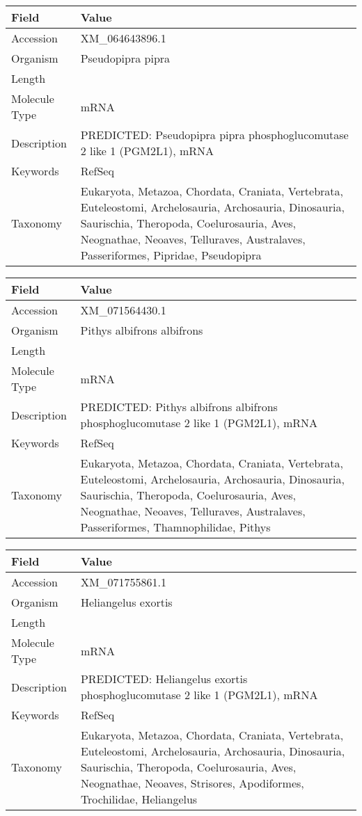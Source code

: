 \documentclass[10pt]{article}
\begin{document}
{\footnotesize
\begin{longtable}{>{\raggedright\arraybackslash}p{4.5cm} >{\raggedright\arraybackslash}p{11.5cm}}
\textbf{Field} & \textbf{Value} \\
\hline
Accession & XM\_064643896.1 \\
Organism & Pseudopipra pipra \\
Length & 5971 \\
Molecule Type & mRNA \\
Description & PREDICTED: Pseudopipra pipra phosphoglucomutase 2 like 1 (PGM2L1), mRNA \\
Keywords & RefSeq \\
Taxonomy & Eukaryota, Metazoa, Chordata, Craniata, Vertebrata, Euteleostomi, Archelosauria, Archosauria, Dinosauria, Saurischia, Theropoda, Coelurosauria, Aves, Neognathae, Neoaves, Telluraves, Australaves, Passeriformes, Pipridae, Pseudopipra \\
\end{longtable}
}

{\footnotesize
\begin{longtable}{>{\raggedright\arraybackslash}p{4.5cm} >{\raggedright\arraybackslash}p{11.5cm}}
\textbf{Field} & \textbf{Value} \\
\hline
Accession & XM\_071564430.1 \\
Organism & Pithys albifrons albifrons \\
Length & 5849 \\
Molecule Type & mRNA \\
Description & PREDICTED: Pithys albifrons albifrons phosphoglucomutase 2 like 1 (PGM2L1), mRNA \\
Keywords & RefSeq \\
Taxonomy & Eukaryota, Metazoa, Chordata, Craniata, Vertebrata, Euteleostomi, Archelosauria, Archosauria, Dinosauria, Saurischia, Theropoda, Coelurosauria, Aves, Neognathae, Neoaves, Telluraves, Australaves, Passeriformes, Thamnophilidae, Pithys \\
\end{longtable}
}

{\footnotesize
\begin{longtable}{>{\raggedright\arraybackslash}p{4.5cm} >{\raggedright\arraybackslash}p{11.5cm}}
\textbf{Field} & \textbf{Value} \\
\hline
Accession & XM\_071755861.1 \\
Organism & Heliangelus exortis \\
Length & 7899 \\
Molecule Type & mRNA \\
Description & PREDICTED: Heliangelus exortis phosphoglucomutase 2 like 1 (PGM2L1), mRNA \\
Keywords & RefSeq \\
Taxonomy & Eukaryota, Metazoa, Chordata, Craniata, Vertebrata, Euteleostomi, Archelosauria, Archosauria, Dinosauria, Saurischia, Theropoda, Coelurosauria, Aves, Neognathae, Neoaves, Strisores, Apodiformes, Trochilidae, Heliangelus \\
\end{longtable}
}
\end{document}
